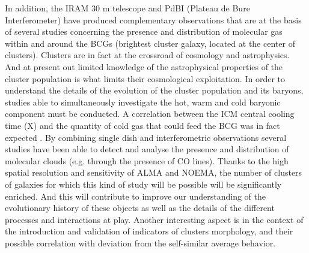 \documentclass[11pt,a4paper,twoside,graphicx,color]{article}
\begin{document}
In addition, the IRAM 30 m telescope and PdBI (Plateau de Bure Interferometer) have produced complementary observations that are at the basis of several studies concerning the presence and distribution of molecular gas within and around the BCGs (brightest cluster galaxy, located at the center of clusters). Clusters are in fact at the crossroad of cosmology and astrophysics. And at present out limited knowledge of the astrophysical properties of the cluster population is what limits their cosmological exploitation.
In order to understand the details of the evolution of the cluster population and its baryons, studies able to simultaneously investigate the hot, warm and cold baryonic component must be conducted. 
A correlation between the ICM central cooling time (X) and the quantity of cold gas that could feed the BCG was in fact expected \citep[and observed, e.g.][]{Cavagnolo2008}. By combining single dish and interferometric observations several studies have been able to detect and analyse the presence and distribution of molecular clouds (e.g. through the presence of CO lines). Thanks to the high spatial resolution and sensitivity of ALMA and NOEMA, the number of clusters of galaxies for which this kind of study will be possible will be significantly enriched. And this will contribute to improve our understanding of the evolutionary history of these objects as well as the details of the different processes and interactions at play. Another interesting aspect is in the context of the introduction and validation of indicators of clusters morphology, and their possible correlation with deviation from the self-similar average behavior.
\end{document}
